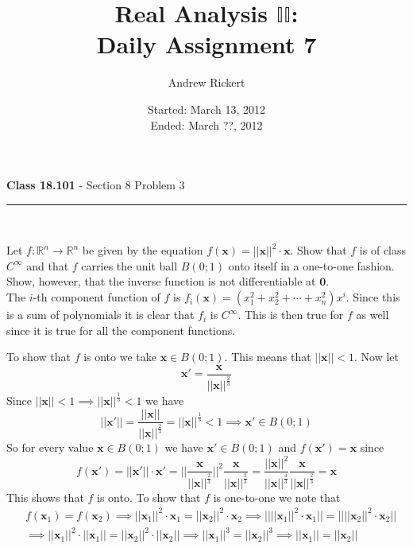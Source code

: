 \documentclass[11pt,reqno]{article}
\title{Real Analysis $\mathbb{II}$: \\ Daily Assignment 7}
\author{Andrew Rickert}
\date{Started: March 13, 2012 \\ \hspace{1pt} Ended: March ??,  2012}                                           %
\begin{document}
\maketitle

\begin{flushleft} 
\textbf{Class 18.101} - Section 8 Problem 3\\
\rule{500pt}{1pt}\\
\end{flushleft} 

Let $f : \mathbb{R}^n \to \mathbb{R}^n$ be given by the equation $f(\textbf{x}) = ||\textbf{x}||^2 \cdot \textbf{x}$. Show that $f$ is of class $C^\infty$ and that $f$ carries the unit ball $B(0;1)$ onto itself in a one-to-one fashion. Show, however, that the inverse function is not differentiable at $\textbf{0}$.\\

The $i$-th component function of $f$ is $f_i(\textbf{x}) = (x_1^2 + x_2^2 + \cdots + x_n^2) x^i$. Since this is a sum of polynomials it is clear that $f_i$ is $C^\infty$. This is then true for $f$ as well since it is true for all the component functions.

To show that $f$ is onto we take $\textbf{x} \in B(0;1)$. This means that $||\textbf{x}|| < 1$. Now let \[ \textbf{x}' = \frac{\textbf{x}}{||\textbf{x}||^{\frac{2}{3}}} \]
Since $||\textbf{x}|| < 1 \implies ||\textbf{x}||^{\frac{1}{3}} < 1$ we have 
\[ ||\textbf{x}'|| = \frac{||\textbf{x}||}{||\textbf{x}||^{\frac{2}{3}}} = ||\textbf{x}||^{\frac{1}{3}} < 1 \implies \textbf{x}' \in B(0;1) \]
So for every value $\textbf{x} \in B(0;1)$ we have $\textbf{x}' \in B(0;1)$ and $f(\textbf{x}') = \textbf{x}$ since 
\[ f(\textbf{x}') = ||\textbf{x}'|| \cdot \textbf{x}' = || \frac{\textbf{x}}{||\textbf{x}||^{\frac{2}{3}}} ||^2 \frac{\textbf{x}}{||\textbf{x}||^{\frac{2}{3}}} =  \frac{||\textbf{x}||^2}{||\textbf{x}||^{\frac{4}{3}}} \frac{\textbf{x}}{||\textbf{x}||^{\frac{2}{3}}} = \textbf{x} \]
This shows that $f$ is onto.
To show that $f$ is one-to-one we note that 
\begin{align*}
& f(\textbf{x}_1) = f(\textbf{x}_2) \implies ||\textbf{x}_1||^2\cdot \textbf{x}_1 = ||\textbf{x}_2||^2\cdot \textbf{x}_2 \implies ||||\textbf{x}_1||^2\cdot \textbf{x}_1 || = ||||\textbf{x}_2||^2\cdot \textbf{x}_2|| \\
& \implies  ||\textbf{x}_1||^2\cdot ||\textbf{x}_1|| = ||\textbf{x}_2||^2\cdot ||\textbf{x}_2|| \implies ||\textbf{x}_1||^3 = ||\textbf{x}_2||^3 \implies ||\textbf{x}_1|| = ||\textbf{x}_2||
\end{align*}
\end{document}
